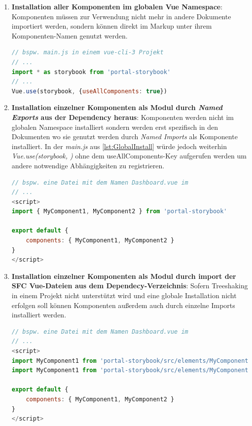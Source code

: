 \begin{enumerate}
    \item \textbf{Installation aller Komponenten im globalen Vue Namespace}: Komponenten müssen zur Verwendung nicht mehr in andere Dokumente importiert werden, sondern können direkt im Markup unter ihrem Komponenten-Namen genutzt werden.
\begin{lstlisting}[language=JavaScript , caption={Globale Installierung},label={lst:GlobalInstall}]
// bspw. main.js in einem vue-cli-3 Projekt
// ...
import * as storybook from 'portal-storybook'
// ...
Vue.use(storybook, {useAllComponents: true})
\end{lstlisting}
    \item \textbf{Installation einzelner Komponenten als Modul durch \textit{Named Exports} aus der Dependency heraus}: Komponenten werden nicht im globalen Namespace installiert sondern werden erst spezifisch in den Dokumenten wo sie genutzt werden durch \textit{Named Imports} als Komponente installiert. In der \textit{main.js} aus \ref{lst:GlobalInstall} würde jedoch weiterhin \textit{Vue.use(storybook, {})} ohne dem useAllComponents-Key aufgerufen werden um andere notwendige Abhängigkeiten zu registrieren. 
\begin{lstlisting}[language=JavaScript , caption={Named Exports/Imports in einer SFC},label={lst:NamedExports}]
// bspw. eine Datei mit dem Namen Dashboard.vue im
// ...
<script>
import { MyComponent1, MyComponent2 } from 'portal-storybook'

export default {
    components: { MyComponent1, MyComponent2 } 
}
</script>
\end{lstlisting}
    \item \textbf{Installation einzelner Komponenten als Modul durch import der SFC Vue-Dateien aus dem Dependecy-Verzeichnis}: Sofern Treeshaking in einem Projekt nicht unterstützt wird und eine globale Installation nicht erfolgen soll können Komponenten außerdem auch durch einzelne Imports installiert werden.
\begin{lstlisting}[language=JavaScript , caption={Default Exports/Imports in einer SFC},label={lst:NamedExports}]
// bspw. eine Datei mit dem Namen Dashboard.vue im
// ...
<script>
import MyComponent1 from 'portal-storybook/src/elements/MyComponent1'
import MyComponent1 from 'portal-storybook/src/elements/MyComponent2'

export default {
    components: { MyComponent1, MyComponent2 } 
}
</script>
\end{lstlisting}
\end{enumerate}
